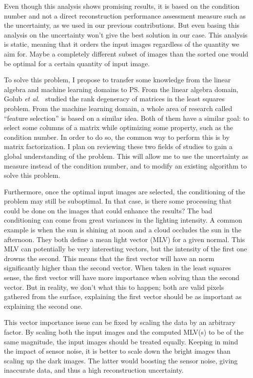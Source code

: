 \documentclass{report}
\begin{document}

Even though this analysis shows promising results, it is based on the condition number and not a direct reconstruction performance assessment measure such as the uncertainty, as we used in our previous contributions. But even basing this analysis on the uncertainty won't give the best solution in our case. This analysis is static, meaning that it orders the input images regardless of the quantity we aim for. Maybe a completely different subset of images than the sorted one would be optimal for a certain quantity of input image.

To solve this problem, I propose to transfer some knowledge from the linear algebra and machine learning domains to PS. From the linear algebra domain, Golub \emph{et al.}~\cite{Golub1977} studied the rank degeneracy of matrices in the least squares problem. From the machine learning domain, a whole area of research called ``feature selection'' is based on a similar idea. Both of them have a similar goal: to select some columns of a matrix while optimizing some property, such as the condition number. In order to do so, the common way to perform this is by matrix factorization. I plan on reviewing these two fields of studies to gain a global understanding of the problem. This will allow me to use the uncertainty as measure instead of the condition number, and to modify an existing algorithm to solve this problem.

Furthermore, once the optimal input images are selected, the conditioning of the problem may still be suboptimal. In that case, is there some processing that could be done on the images that could enhance the results? The bad conditioning can come from great variances in the lighting intensity. A common example is when the sun is shining at noon and a cloud occludes the sun in the afternoon. They both define a mean light vector (MLV) for a given normal. This MLV can potentially be very interesting vectors, but the intensity of the first one drowns the second. This means that the first vector will have an norm significantly higher than the second vector. When taken in the least squares sense, the first vector will have more importance when solving than the second vector. But in reality, we don't what this to happen; both are valid pixels gathered from the surface, explaining the first vector should be as important as explaining the second one.

This vector importance issue can be fixed by scaling the data by an arbitrary factor. By scaling both the input images and the computed MLV(s) to be of the same magnitude, the input images should be treated equally. Keeping in mind the impact of sensor noise, it is better to scale down the bright images than scaling up the dark images. The latter would boosting the sensor noise, giving inaccurate data, and thus a high reconstruction uncertainty.
\end{document}
